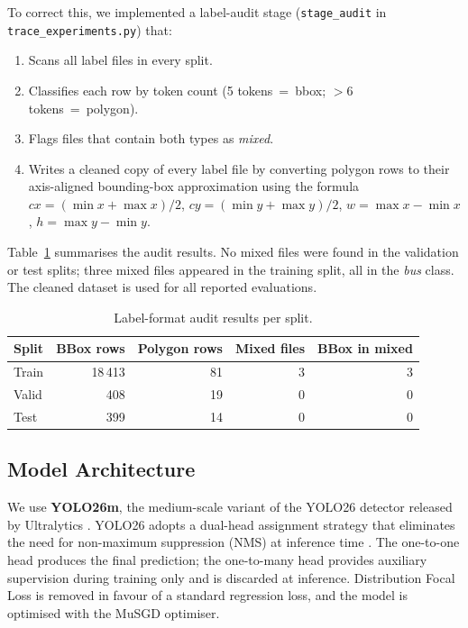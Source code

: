 To correct this, we implemented a label-audit stage
(\texttt{stage\_audit} in \texttt{trace\_experiments.py}) that:
\begin{enumerate}
  \item Scans all label files in every split.
  \item Classifies each row by token count (5 tokens~=~bbox;
        $>6$ tokens~=~polygon).
  \item Flags files that contain both types as \emph{mixed}.
  \item Writes a cleaned copy of every label file by converting
        polygon rows to their axis-aligned bounding-box approximation
        using the formula
        $cx = (\min x + \max x)/2$, $cy = (\min y + \max y)/2$,
        $w = \max x - \min x$, $h = \max y - \min y$.
\end{enumerate}

Table~\ref{tab:audit} summarises the audit results.
No mixed files were found in the validation or test splits;
three mixed files appeared in the training split, all in the
\textit{bus} class.
The cleaned dataset is used for all reported evaluations.

\begin{table}[htbp]
\centering
\caption{Label-format audit results per split.}
\label{tab:audit}
\begin{tabular}{lrrrr}
\toprule
Split & BBox rows & Polygon rows & Mixed files & BBox in mixed \\
\midrule
Train & 18\,413 & 81 & 3 & 3 \\
Valid &    408  & 19 & 0 & 0 \\
Test  &    399  & 14 & 0 & 0 \\
\bottomrule
\end{tabular}
\end{table}

\subsection{Model Architecture}
\label{sec:model}

We use \textbf{YOLO26m}, the medium-scale variant of the YOLO26 detector
released by Ultralytics \cite{yolo262023}.
YOLO26 adopts a dual-head assignment strategy that eliminates the need for
non-maximum suppression (NMS) at inference time \cite{wang2024yolov10}.
The one-to-one head produces the final prediction; the one-to-many head
provides auxiliary supervision during training only and is discarded at
inference.
Distribution Focal Loss is removed in favour of a standard regression loss,
and the model is optimised with the MuSGD optimiser.

